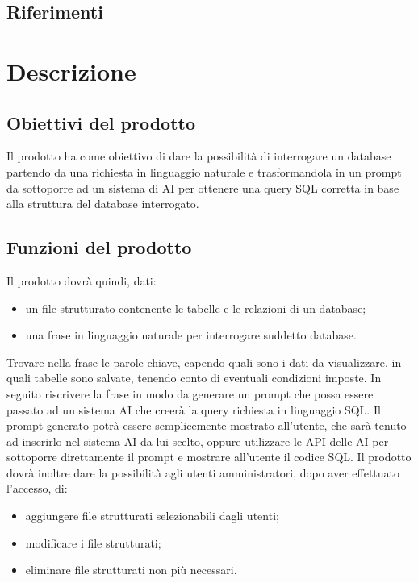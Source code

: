 \documentclass[5pt]{article}
\begin{document}
\subsection{Riferimenti}

\section{Descrizione}
\subsection{Obiettivi del prodotto}
Il prodotto ha come obiettivo di dare la possibilità di interrogare un database partendo da una richiesta in linguaggio naturale e trasformandola in un prompt da sottoporre ad un sistema di AI per ottenere una query SQL corretta in base alla struttura del database interrogato.

\subsection{Funzioni del prodotto}
Il prodotto dovrà quindi, dati:
\begin{itemize}
    \item un file strutturato contenente le tabelle e le relazioni di un database;
    \item una frase in linguaggio naturale per interrogare suddetto database.
\end{itemize}
Trovare nella frase le parole chiave, capendo quali sono i dati da visualizzare, in quali tabelle sono salvate, tenendo conto di eventuali condizioni imposte.
In seguito riscrivere la frase in modo da generare un prompt che possa essere passato ad un sistema AI che creerà la query richiesta in linguaggio SQL.
Il prompt generato potrà essere semplicemente mostrato all’utente, che sarà tenuto ad inserirlo nel sistema AI da lui scelto, oppure utilizzare le API delle AI per sottoporre direttamente il prompt e mostrare all’utente il codice SQL.
Il prodotto dovrà inoltre dare la possibilità agli utenti amministratori, dopo aver effettuato l’accesso, di:
\begin{itemize}
    \item aggiungere file strutturati selezionabili dagli utenti;
    \item modificare i file strutturati;
    \item eliminare file strutturati non più necessari.
\end{itemize}
\end{document}
